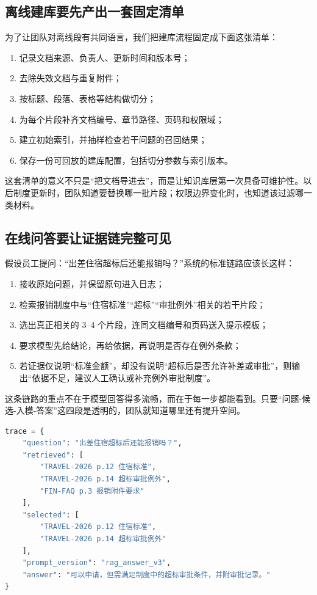 \subsection{离线建库要先产出一套固定清单}
为了让团队对离线段有共同语言，我们把建库流程固定成下面这张清单：
\begin{enumerate}
  \item 记录文档来源、负责人、更新时间和版本号；
  \item 去除失效文档与重复附件；
  \item 按标题、段落、表格等结构做切分；
  \item 为每个片段补齐文档编号、章节路径、页码和权限域；
  \item 建立初始索引，并抽样检查若干问题的召回结果；
  \item 保存一份可回放的建库配置，包括切分参数与索引版本。
\end{enumerate}

这套清单的意义不只是“把文档导进去”，而是让知识库层第一次具备可维护性。以后制度更新时，团队知道要替换哪一批片段；权限边界变化时，也知道该过滤哪一类材料。

\subsection{在线问答要让证据链完整可见}
假设员工提问：“出差住宿超标后还能报销吗？”系统的标准链路应该长这样：
\begin{enumerate}
  \item 接收原始问题，并保留原句进入日志；
  \item 检索报销制度中与“住宿标准”“超标”“审批例外”相关的若干片段；
  \item 选出真正相关的 3--4 个片段，连同文档编号和页码送入提示模板；
  \item 要求模型先给结论，再给依据，再说明是否存在例外条款；
  \item 若证据仅说明“标准金额”，却没有说明“超标后是否允许补差或审批”，则输出“依据不足，建议人工确认或补充例外审批制度”。
\end{enumerate}

这条链路的重点不在于模型回答得多流畅，而在于每一步都能看到。只要“问题-候选-入模-答案”这四段是透明的，团队就知道哪里还有提升空间。

\begin{lstlisting}[language=Python]
trace = {
    "question": "出差住宿超标后还能报销吗？",
    "retrieved": [
        "TRAVEL-2026 p.12 住宿标准",
        "TRAVEL-2026 p.14 超标审批例外",
        "FIN-FAQ p.3 报销附件要求"
    ],
    "selected": [
        "TRAVEL-2026 p.12 住宿标准",
        "TRAVEL-2026 p.14 超标审批例外"
    ],
    "prompt_version": "rag_answer_v3",
    "answer": "可以申请，但需满足制度中的超标审批条件，并附审批记录。"
}
\end{lstlisting}

